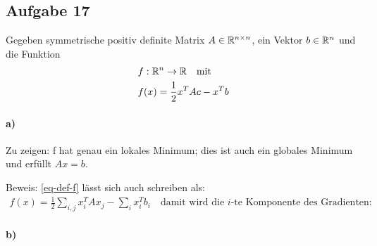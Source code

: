 \subsection*{Aufgabe 17}
Gegeben symmetrische positiv definite Matrix $A \in \mathbb R^{n \times n}$, ein Vektor
$b \in \mathbb R^n$ und die Funktion
\begin{align}
  \nonumber
  & f : \mathbb R^n \rightarrow \mathbb R \quad \text{mit}\\
  \label{eq-def-f}
  & f(x) = \frac{1}{2} x^T A c - x^T b
\end{align}

\paragraph*{a)}
Zu zeigen: f hat genau ein lokales Minimum; dies ist auch ein globales Minimum
und erfüllt $A x = b$.

Beweis: \eqref{eq-def-f} lässt sich auch schreiben als:
\begin{align*}
  f(x) =  \frac{1}{2} \sum_{i, j}x_i^T A x_j - \sum_i x_i^T b_i
  \quad \text{damit wird die $i$-te Komponente des Gradienten:}
\end{align*}



\paragraph*{b)}
